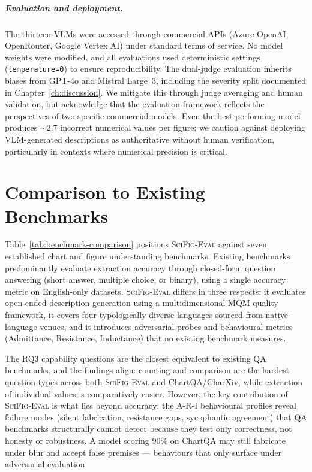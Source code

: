 \paragraph{Evaluation and deployment.}
The thirteen VLMs were accessed through commercial APIs (Azure OpenAI, OpenRouter, Google Vertex AI) under standard terms of service. No model weights were modified, and all evaluations used deterministic settings (\texttt{temperature=0}) to ensure reproducibility.
The dual-judge evaluation inherits biases from GPT-4o and Mistral Large~3, including the severity split documented in Chapter~\ref{ch:discussion}. We mitigate this through judge averaging and human validation, but acknowledge that the evaluation framework reflects the perspectives of two specific commercial models.
Even the best-performing model produces ${\sim}2.7$ incorrect numerical values per figure; we caution against deploying VLM-generated descriptions as authoritative without human verification, particularly in contexts where numerical precision is critical.

\chapter{Comparison to Existing Benchmarks}
\label{app:benchmark-comparison}

\small
Table~\ref{tab:benchmark-comparison} positions \textsc{SciFig-Eval} against seven established chart and figure understanding benchmarks.
Existing benchmarks predominantly evaluate extraction accuracy through closed-form question answering (short answer, multiple choice, or binary), using a single accuracy metric on English-only datasets.
\textsc{SciFig-Eval} differs in three respects: it evaluates open-ended description generation using a multidimensional MQM quality framework, it covers four typologically diverse languages sourced from native-language venues, and it introduces adversarial probes and behavioural metrics (Admittance, Resistance, Inductance) that no existing benchmark measures.

The RQ3 capability questions are the closest equivalent to existing QA benchmarks, and the findings align: counting and comparison are the hardest question types across both \textsc{SciFig-Eval} and ChartQA/CharXiv, while extraction of individual values is comparatively easier.
However, the key contribution of \textsc{SciFig-Eval} is what lies beyond accuracy: the A-R-I behavioural profiles reveal failure modes (silent fabrication, resistance gaps, sycophantic agreement) that QA benchmarks structurally cannot detect because they test only correctness, not honesty or robustness.
A model scoring 90\% on ChartQA may still fabricate under blur and accept false premises --- behaviours that only surface under adversarial evaluation.

